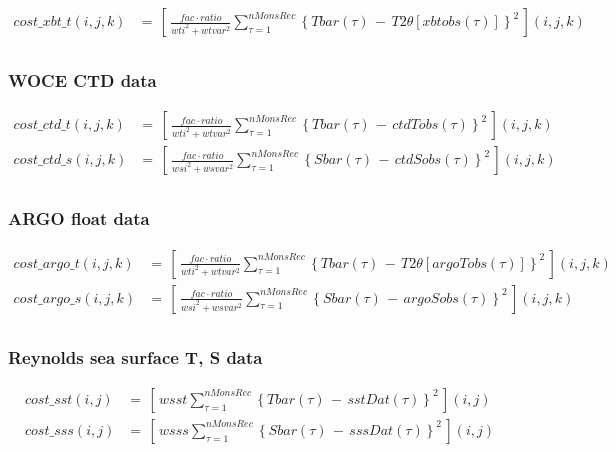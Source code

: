\begin{equation}
\begin{split}
cost\_xbt\_t(i,j,k) & = \,
\left[ \, \frac{fac \cdot ratio}{wti^2 + wtvar^2} \sum_{\tau=1}^{nMonsRec}
\left\{ Tbar(\tau) \, - \, T2\theta[xbtobs(\tau)] \right\}^2 \, \right](i,j,k)
 \\
\end{split}
\end{equation}

\subsubsection{WOCE CTD data}

\begin{equation}
\begin{split}
cost\_ctd\_t(i,j,k) & = \,
\left[ \, \frac{fac \cdot ratio}{wti^2 + wtvar^2} \sum_{\tau=1}^{nMonsRec}
\left\{ Tbar(\tau) \, - \, ctdTobs(\tau) \right\}^2 \, \right](i,j,k)
 \\
cost\_ctd\_s(i,j,k) & = \,
\left[ \, \frac{fac \cdot ratio}{wsi^2 + wsvar^2} \sum_{\tau=1}^{nMonsRec}
\left\{ Sbar(\tau) \, - \, ctdSobs(\tau) \right\}^2 \, \right](i,j,k)
 \\
\end{split}
\end{equation}

\subsubsection{ARGO float data}

\begin{equation}
\begin{split}
cost\_argo\_t(i,j,k) & = \,
\left[ \, \frac{fac \cdot ratio}{wti^2 + wtvar^2} \sum_{\tau=1}^{nMonsRec}
\left\{ Tbar(\tau) \, - \, T2\theta[argoTobs(\tau)] \right\}^2 \, \right](i,j,k)
 \\
cost\_argo\_s(i,j,k) & = \,
\left[ \, \frac{fac \cdot ratio}{wsi^2 + wsvar^2} \sum_{\tau=1}^{nMonsRec}
\left\{ Sbar(\tau) \, - \, argoSobs(\tau) \right\}^2 \, \right](i,j,k)
 \\
\end{split}
\end{equation}

\subsubsection{Reynolds sea surface T, S data}

\begin{equation}
\begin{split}
cost\_sst(i,j) & = \,
\left[ \, wsst \sum_{\tau=1}^{nMonsRec}
\left\{ Tbar(\tau) \, - \, sstDat(\tau) \right\}^2 \, \right](i,j)
 \\
cost\_sss(i,j) & = \,
\left[ \, wsss \sum_{\tau=1}^{nMonsRec}
\left\{ Sbar(\tau) \, - \, sssDat(\tau) \right\}^2 \, \right](i,j)
 \\
\end{split}
\end{equation}

